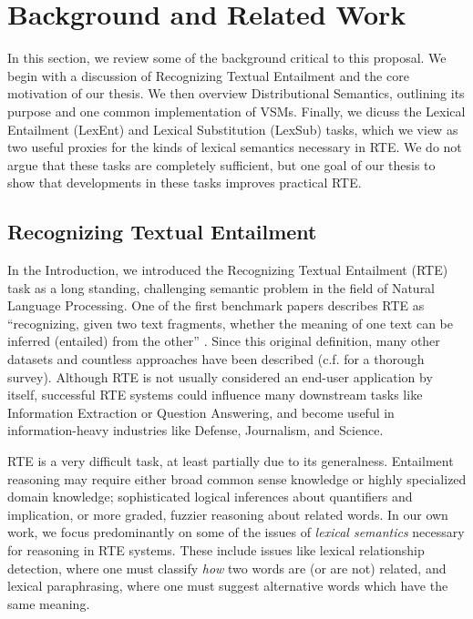 \documentclass[12pt]{article}
\begin{document}
\pagebreak
\section{Background and Related Work}
\label{sec:background}

In this section, we review some of the background critical to this proposal.
We begin with a discussion of Recognizing Textual Entailment and the core
motivation of our thesis.  We then overview Distributional Semantics, outlining
its purpose and one common implementation of VSMs. Finally, we dicuss the
Lexical Entailment (LexEnt) and Lexical Substitution (LexSub) tasks, which we
view as two useful proxies for the kinds of lexical semantics necessary in
RTE. We do not argue that these tasks are completely sufficient, but one goal
of our thesis to show that developments in these tasks improves practical RTE.

\subsection{Recognizing Textual Entailment}
\label{sec:textent}

In the Introduction, we introduced the Recognizing Textual Entailment (RTE)
task as a long standing, challenging semantic problem in the field of
Natural Language Processing.  One of the first benchmark papers describes RTE
as ``recognizing, given two text fragments, whether the meaning of one text can
be inferred (entailed) from the other'' \cite{dagan:2006:mlc}. Since this
original definition, many other datasets
\cite{giampiccolo:2007:pascal,bentivogli:2009:tac,marelli:2014:semeval} and
countless approaches have been described (c.f. 
for a thorough survey). Although RTE is not usually considered an
end-user application by itself, successful RTE systems could influence many
downstream tasks like Information Extraction or Question Answering, and become
useful in information-heavy industries like Defense, Journalism, and Science.

RTE is a very difficult task, at least partially due to its generalness.
Entailment reasoning may require either broad common sense knowledge or highly
specialized domain knowledge; sophisticated logical inferences
about quantifiers and implication, or more graded, fuzzier reasoning about
related words. In our own work, we focus predominantly on some of the issues
of {\em lexical semantics} necessary for reasoning in RTE systems. These
include issues like lexical relationship detection, where one must classify
{\em how} two words are (or are not) related, and lexical paraphrasing, where
one must suggest alternative words which have the same meaning.
\end{document}
